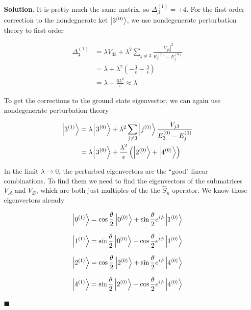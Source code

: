 \documentclass[12pt]{article}
\theoremstyle{definition}
\newenvironment{s}{%
        \begin{trivlist} \item \textbf{Solution}. }{%
            \hspace*{\fill} $\blacksquare$\end{trivlist}}%
\begin{document}
{\begin{s}
It is pretty much the same matrix, so $\Delta_{\beta}^{(1)} = \pm 4$. For the first order correction to the nondegnerate ket $\ket{3^{(0)}}$, we use nondegenerate perturbation theory to first order

\begin{align*}
\Delta_{3}^{(1)} &= \lambda V_{33} + \lambda^{2}\sum_{j\neq 3}\frac{|V_{j3}|^{2}}{E_{3}^{(0)}-E_{j}^{(0)}}\\
&= \lambda + \lambda^{2}\left(-\frac{3}{\epsilon}-\frac{3}{\epsilon}\right)\\
&= \lambda - \frac{6\lambda^{2}}{\epsilon} \approx \lambda
\end{align*}

To get the corrections to the ground state eigenvector, we can again use nondegenerate perturbation theory 

\begin{align*}
\ket{3^{(1)}} &= \lambda\ket{3^{(0)}} + \lambda^{2}\sum_{j\neq 3}\ket{j^{(0)}}\frac{V_{j3}}{E_{3}^{(0)}-E_{j}^{(0)}}\\
&= \lambda\ket{3^{(0)}} + \frac{\lambda^{2}}{\epsilon}\left(\ket{2^{(0)}}+\ket{4^{(0)}}\right)
\end{align*}

In the limit $\lambda \rightarrow 0$, the perturbed eigenvectors are the ``good" linear combinations. To find them we need to find the eigenvectors of the submatrices $V_{\mathcal{A}}$ and $V_{\mathcal{B}}$, which are both just multiples of the the $\hat{S}_n$ operator. We know those eigenvectors already

\begin{align*}
\ket{0^{(1)}} = \cos\frac{\theta}{2}\ket{0^{(0)}} + \sin\frac{\theta}{2}e^{i\phi}\ket{1^{(0)}}
\end{align*}

\begin{align*}
\ket{1^{(1)}} = \sin\frac{\theta}{2}\ket{0^{(0)}} - \cos\frac{\theta}{2}e^{i\phi}\ket{1^{(0)}}
\end{align*}

\begin{align*}
\ket{2^{(1)}} = \cos\frac{\theta}{2}\ket{2^{(0)}} + \sin\frac{\theta}{2}e^{i\phi}\ket{4^{(0)}}
\end{align*}

\begin{align*}
\ket{4^{(1)}} = \sin\frac{\theta}{2}\ket{2^{(0)}} - \cos\frac{\theta}{2}e^{i\phi}\ket{4^{(0)}}
\end{align*}




\end{s}}
\end{document}
